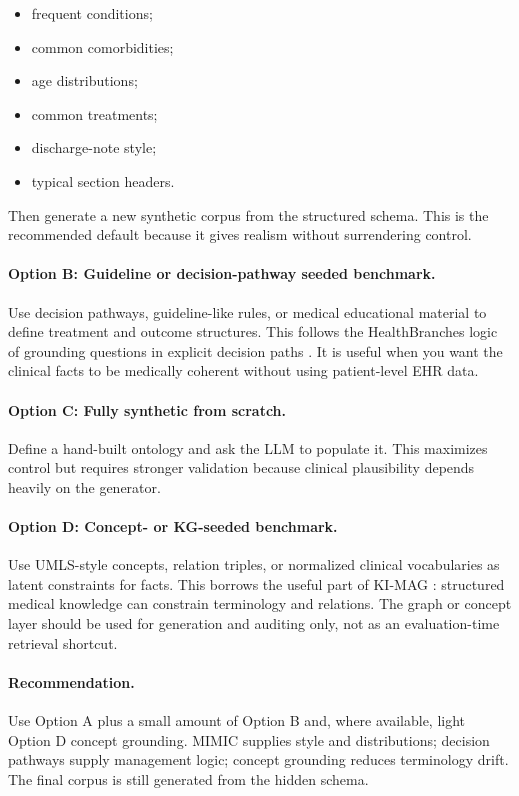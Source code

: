 \documentclass[11pt,a4paper]{article}
\begin{document}
\begin{itemize}[leftmargin=*]
	\item frequent conditions;
	\item common comorbidities;
	\item age distributions;
	\item common treatments;
	\item discharge-note style;
	\item typical section headers.
\end{itemize}

Then generate a new synthetic corpus from the structured schema. This is the recommended default because it gives realism without surrendering control.

\paragraph{Option B: Guideline or decision-pathway seeded benchmark.}
Use decision pathways, guideline-like rules, or medical educational material to define treatment and outcome structures. This follows the HealthBranches logic of grounding questions in explicit decision paths \citep{cosentino2025healthbranches}. It is useful when you want the clinical facts to be medically coherent without using patient-level EHR data.

\paragraph{Option C: Fully synthetic from scratch.}
Define a hand-built ontology and ask the LLM to populate it. This maximizes control but requires stronger validation because clinical plausibility depends heavily on the generator.

\paragraph{Option D: Concept- or KG-seeded benchmark.}
Use UMLS-style concepts, relation triples, or normalized clinical vocabularies as latent constraints for facts. This borrows the useful part of KI-MAG \citep{zafar2024kimag}: structured medical knowledge can constrain terminology and relations. The graph or concept layer should be used for generation and auditing only, not as an evaluation-time retrieval shortcut.

\paragraph{Recommendation.}
Use Option A plus a small amount of Option B and, where available, light Option D concept grounding. MIMIC supplies style and distributions; decision pathways supply management logic; concept grounding reduces terminology drift. The final corpus is still generated from the hidden schema.
\end{document}
